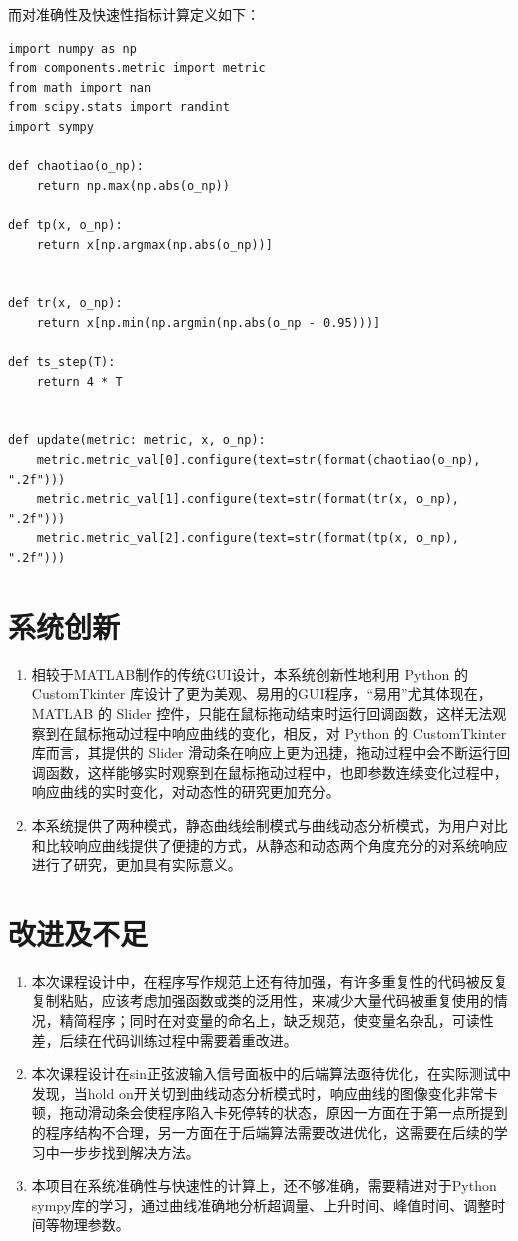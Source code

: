 \documentclass[12pt]{ctexart}
\begin{document}
而对准确性及快速性指标计算定义如下：

\begin{lstlisting}[title=metric_caculate.py]
import numpy as np
from components.metric import metric
from math import nan
from scipy.stats import randint
import sympy

def chaotiao(o_np):
    return np.max(np.abs(o_np))

def tp(x, o_np):
    return x[np.argmax(np.abs(o_np))]


def tr(x, o_np):
    return x[np.min(np.argmin(np.abs(o_np - 0.95)))]

def ts_step(T):
    return 4 * T


def update(metric: metric, x, o_np):
    metric.metric_val[0].configure(text=str(format(chaotiao(o_np), ".2f")))
    metric.metric_val[1].configure(text=str(format(tr(x, o_np), ".2f")))
    metric.metric_val[2].configure(text=str(format(tp(x, o_np), ".2f")))
\end{lstlisting}

\section{系统创新}
\begin{enumerate}
	\item 相较于MATLAB制作的传统GUI设计，本系统创新性地利用 Python 的 CustomTkinter 库设计了更为美观、易用的GUI程序，“易用”尤其体现在，MATLAB 的 Slider 控件，只能在鼠标拖动结束时运行回调函数，这样无法观察到在鼠标拖动过程中响应曲线的变化，相反，对 Python 的 CustomTkinter库而言，其提供的 Slider 滑动条在响应上更为迅捷，拖动过程中会不断运行回调函数，这样能够实时观察到在鼠标拖动过程中，也即参数连续变化过程中，响应曲线的实时变化，对动态性的研究更加充分。
	\item 本系统提供了两种模式，静态曲线绘制模式与曲线动态分析模式，为用户对比和比较响应曲线提供了便捷的方式，从静态和动态两个角度充分的对系统响应进行了研究，更加具有实际意义。
\end{enumerate}


\section{改进及不足}
\begin{enumerate}
	\item 本次课程设计中，在程序写作规范上还有待加强，有许多重复性的代码被反复复制粘贴，应该考虑加强函数或类的泛用性，来减少大量代码被重复使用的情况，精简程序；同时在对变量的命名上，缺乏规范，使变量名杂乱，可读性差，后续在代码训练过程中需要着重改进。
	\item 本次课程设计在sin正弦波输入信号面板中的后端算法亟待优化，在实际测试中发现，当hold on开关切到曲线动态分析模式时，响应曲线的图像变化非常卡顿，拖动滑动条会使程序陷入卡死停转的状态，原因一方面在于第一点所提到的程序结构不合理，另一方面在于后端算法需要改进优化，这需要在后续的学习中一步步找到解决方法。
	
	\item 本项目在系统准确性与快速性的计算上，还不够准确，需要精进对于Python sympy库的学习，通过曲线准确地分析超调量、上升时间、峰值时间、调整时间等物理参数。
\end{enumerate}
\end{document}
